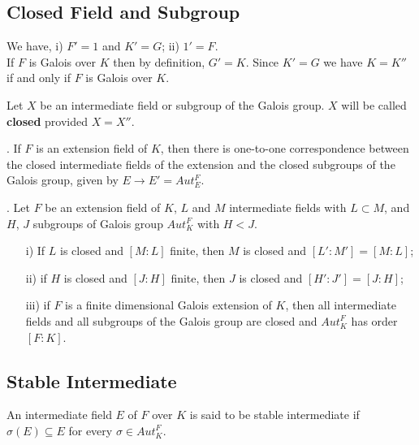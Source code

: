 \subsection{Closed Field and Subgroup}
We have, \hspace{2cm}
i) \(F'=1\) and \(K'=G\); \hspace{3cm} ii) \(1'=F\).\\

If \(F\) is Galois over \(K\) then by definition, \(G'=K\). Since \(K'=G\) we have \(K=K''\) if and only if \(F\) is Galois over \(K\).

\begin{definition}
  Let \(X\) be an intermediate field or subgroup of the Galois group. \(X\) will be called \textbf{closed} provided \(X=X''\).\\
\end{definition}

\begin{lemma}. If \(F\) is an extension field of \(K\), then there is one-to-one correspondence between the closed intermediate fields of the extension and the closed subgroups of the Galois group, given by \(E \rightarrow E' =  Aut_E^F\).
\end{lemma}

\begin{lemma}. Let \(F\) be an extension field of \(K\), \(L\) and \(M\) intermediate fields with \(L \subset M\), and \(H\), \(J\) subgroups of Galois group \(Aut_K^F\) with \(H<J\).
  \begin{enumerate}
  \item[i)] If \(L\) is closed and \([M:L]\) finite, then \(M\) is closed and \([L':M']=[M:L]\);
  \item[ii)] if \(H\) is closed and \([J:H]\) finite, then \(J\) is closed and \([H':J']=[J:H]\);
  \item[iii)] if \(F\) is a finite dimensional Galois extension of \(K\), then all intermediate fields and all subgroups of the Galois group are closed and \(Aut_K^F\) has order \([F:K]\).
  \end{enumerate}
\end{lemma}


\subsection{Stable Intermediate}
\begin{definition}
  An intermediate field \(E\) of \(F\) over \(K\) is said to be stable intermediate if \(\sigma(E) \subseteq E\) for every \(\sigma \in Aut_K^F\).
\end{definition}

